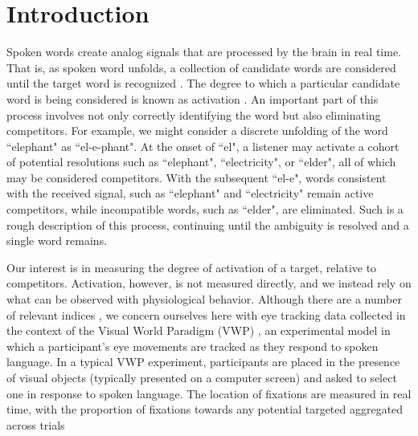 \section{Introduction}


Spoken words create analog signals that are processed by the brain in real time. That is, as spoken word unfolds, a collection of candidate words are considered until the target word is recognized \citep{MarslenWilson1987}. The degree to which a particular candidate word is being considered is known as activation \citep{McClelland1981}. An important part of this process involves not only correctly identifying the word but also eliminating competitors. For example, we might consider a discrete unfolding of the word ``elephant" as ``el-e-phant". At the onset of ``el", a listener may activate a cohort of potential resolutions such as ``elephant", ``electricity", or ``elder", all of which may be considered competitors. With the subsequent ``el-e", words consistent with the received signal, such as ``elephant" and ``electricity" remain active competitors, while incompatible words, such as ``elder", are eliminated. Such is a rough description of this process, continuing until the ambiguity is resolved and a single word remains.




Our interest is in measuring the degree of activation of a target, relative to competitors. Activation, however, is not measured directly, and we instead rely on what can be observed with physiological behavior. Although there are a number of relevant indices \citep{Spivey2005}, we concern ourselves here with eye tracking data collected in the context of the Visual World Paradigm (VWP) \cite{tanenhaus1995integration}, an experimental model in which a participant's eye movements are tracked as they respond to spoken language. In a typical VWP experiment, participants are placed in the presence of visual objects (typically presented on a computer screen) and asked to select one in response to spoken language. The location of fixations are measured in real time, with the proportion of fixations towards any potential targeted aggregated across trials



